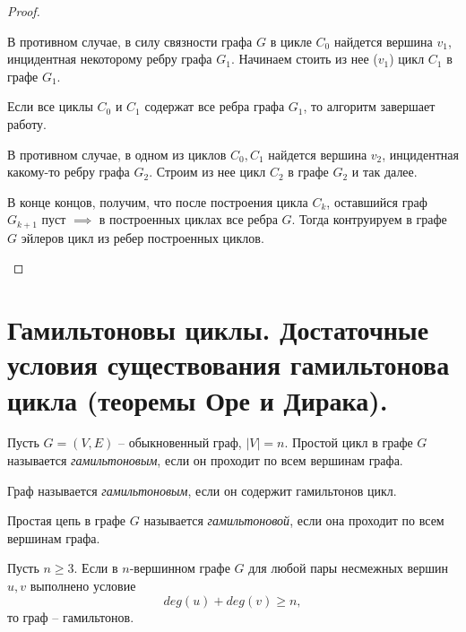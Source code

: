 \begin{proof}
\begin{description}
\begin{note}
                  В противном случае, в силу связности графа $ G $ в цикле $ C_0 $ найдется вершина $ v_1 $, инцидентная некоторому ребру графа $ G_1 $. Начинаем стоить из нее ($ v_1 $) цикл $ C_1 $ в графе $ G_1 $.
                  \begin{figure}[H]
                      \centering
                      \label{fig:fig_10}
                  \end{figure}

                  Если все циклы $ C_0 $ и $ C_1 $ содержат все ребра графа $ G_1 $, то алгоритм завершает работу.

                  В противном случае, в одном из циклов $ C_0,C_1 $ найдется вершина $ v_2 $, инцидентная какому-то ребру графа $ G_2 $. Строим из нее цикл $ C_2 $ в графе $ G_2 $ и так далее.

                  В конце концов, получим, что после построения цикла $ C_k $, оставшийся граф $ G_{k+1} $ пуст $ \implies $ в построенных циклах все ребра $ G $. Тогда контруируем в графе $ G $ эйлеров цикл из ребер построенных циклов.
              \end{note}
    \end{description}
\end{proof}

\section{Гамильтоновы циклы. Достаточные условия существования гамильтонова цикла (теоремы Оре и Дирака).}

\begin{definition}
    Пусть $ G = (V,E) $ -- обыкновенный граф, $ | V | = n  $. Простой цикл в графе $ G $ называется \emph{гамильтоновым}, если он проходит по всем вершинам графа.

    Граф называется \emph{гамильтоновым}, если он содержит гамильтонов цикл.
\end{definition}

\begin{definition}
    Простая цепь в графе $ G $ называется \emph{гамильтоновой}, если она проходит по всем вершинам графа.
\end{definition}

\begin{theorem}[Оре, 1960]
    Пусть $ n \geqslant 3 $. Если в $ n $-вершинном графе $ G $ для любой пары несмежных вершин $ u,v $ выполнено условие
    \[
        deg(u) + deg(v) \geqslant n,
    \]
    то граф -- гамильтонов.
\end{theorem}

